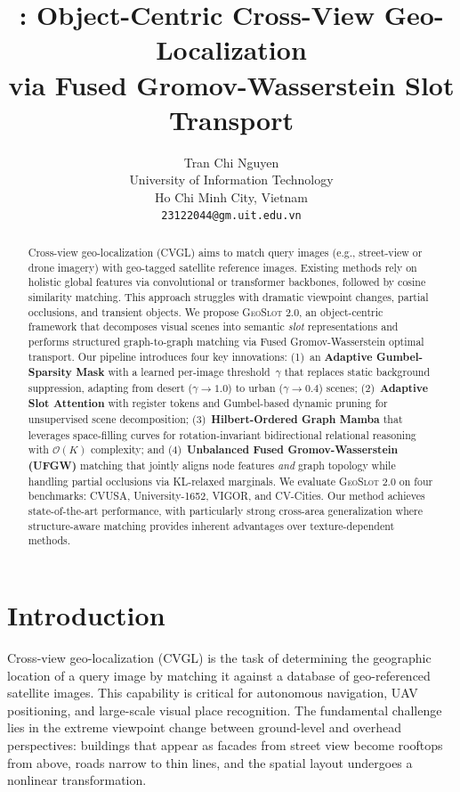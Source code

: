 \documentclass{article}
\title{\oursv{}: Object-Centric Cross-View Geo-Localization \\ via Fused Gromov-Wasserstein Slot Transport}
\author{
  Tran Chi Nguyen \\
  University of Information Technology \\
  Ho Chi Minh City, Vietnam \\
  \texttt{23122044@gm.uit.edu.vn}
}
\newcommand{\oursv}{\textsc{GeoSlot 2.0}}
\begin{document}
\maketitle

\begin{abstract}
Cross-view geo-localization (CVGL) aims to match query images (e.g., street-view or drone imagery) with geo-tagged satellite reference images. Existing methods rely on holistic global features via convolutional or transformer backbones, followed by cosine similarity matching. This approach struggles with dramatic viewpoint changes, partial occlusions, and transient objects. We propose \oursv{}, an object-centric framework that decomposes visual scenes into semantic \textit{slot} representations and performs structured graph-to-graph matching via Fused Gromov-Wasserstein optimal transport. Our pipeline introduces four key innovations: (1)~an \textbf{Adaptive Gumbel-Sparsity Mask} with a learned per-image threshold~$\gamma$ that replaces static background suppression, adapting from desert ($\gamma{\to}1.0$) to urban ($\gamma{\to}0.4$) scenes; (2)~\textbf{Adaptive Slot Attention} with register tokens and Gumbel-based dynamic pruning for unsupervised scene decomposition; (3)~\textbf{Hilbert-Ordered Graph Mamba} that leverages space-filling curves for rotation-invariant bidirectional relational reasoning with $\mathcal{O}(K)$ complexity; and (4)~\textbf{Unbalanced Fused Gromov-Wasserstein (UFGW)} matching that jointly aligns node features \textit{and} graph topology while handling partial occlusions via KL-relaxed marginals. We evaluate \oursv{} on four benchmarks: CVUSA, University-1652, VIGOR, and CV-Cities. Our method achieves state-of-the-art performance, with particularly strong cross-area generalization where structure-aware matching provides inherent advantages over texture-dependent methods.
\end{abstract}

\section{Introduction}\label{sec:intro}

Cross-view geo-localization (CVGL) is the task of determining the geographic location of a query image by matching it against a database of geo-referenced satellite images. This capability is critical for autonomous navigation, UAV positioning, and large-scale visual place recognition. The fundamental challenge lies in the extreme viewpoint change between ground-level and overhead perspectives: buildings that appear as facades from street view become rooftops from above, roads narrow to thin lines, and the spatial layout undergoes a nonlinear transformation.
\end{document}
